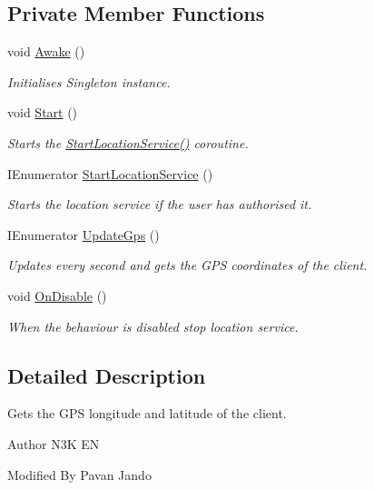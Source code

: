 \subsection*{Private Member Functions}
\begin{DoxyCompactItemize}
\item 
void \mbox{\hyperlink{class_gps_a13244891c04234f5c7351779bfa20bae}{Awake}} ()
\begin{DoxyCompactList}\small\item\em Initialises Singleton instance. \end{DoxyCompactList}\item 
void \mbox{\hyperlink{class_gps_a18ae27d5aa990af06a42dd8d44f188ee}{Start}} ()
\begin{DoxyCompactList}\small\item\em Starts the \mbox{\hyperlink{class_gps_aa67e567c766cc77fa070956e39ff9f73}{Start\+Location\+Service()}} coroutine. \end{DoxyCompactList}\item 
I\+Enumerator \mbox{\hyperlink{class_gps_aa67e567c766cc77fa070956e39ff9f73}{Start\+Location\+Service}} ()
\begin{DoxyCompactList}\small\item\em Starts the location service if the user has authorised it. \end{DoxyCompactList}\item 
I\+Enumerator \mbox{\hyperlink{class_gps_a6e153f3ff7ee313f35978f0484872f30}{Update\+Gps}} ()
\begin{DoxyCompactList}\small\item\em Updates every second and gets the G\+PS coordinates of the client. \end{DoxyCompactList}\item 
void \mbox{\hyperlink{class_gps_a8bbfefeb0421b171d4ee9f7abf0474aa}{On\+Disable}} ()
\begin{DoxyCompactList}\small\item\em When the behaviour is disabled stop location service. \end{DoxyCompactList}\end{DoxyCompactItemize}


\subsection{Detailed Description}
Gets the G\+PS longitude and latitude of the client. 

\begin{DoxyAuthor}{Author}
N3K EN 

Modified By Pavan Jando
\end{DoxyAuthor}


